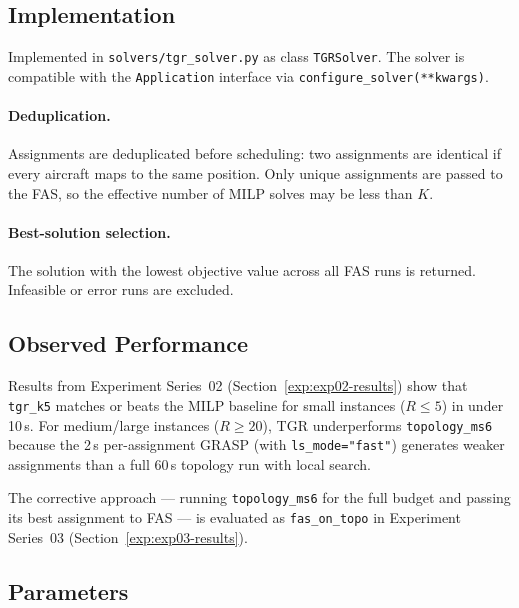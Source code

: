 \subsection{Implementation}

Implemented in \texttt{solvers/tgr\_solver.py} as class \texttt{TGRSolver}.
The solver is compatible with the \texttt{Application} interface via
\texttt{configure\_solver(**kwargs)}.

\paragraph{Deduplication.}
Assignments are deduplicated before scheduling: two assignments are
identical if every aircraft maps to the same position.  Only unique
assignments are passed to the FAS, so the effective number of MILP solves
may be less than $K$.

\paragraph{Best-solution selection.}
The solution with the lowest objective value across all FAS runs is
returned.  Infeasible or error runs are excluded.

\subsection{Observed Performance}

Results from Experiment Series~02 (Section~\ref{exp:exp02-results})
show that \texttt{tgr\_k5} matches or beats the MILP baseline for small
instances ($R \leq 5$) in under 10\,s.  For medium/large instances
($R \geq 20$), TGR underperforms \texttt{topology\_ms6} because the
2\,s per-assignment GRASP (with \texttt{ls\_mode="fast"}) generates
weaker assignments than a full 60\,s topology run with local search.

The corrective approach — running \texttt{topology\_ms6} for the full
budget and passing its best assignment to FAS — is evaluated as
\texttt{fas\_on\_topo} in Experiment Series~03
(Section~\ref{exp:exp03-results}).

\subsection{Parameters}

